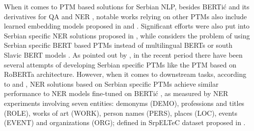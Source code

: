 When it comes to PTM based solutions for Serbian NLP, besides BERTić \cite{ljubevsic2021bertic} and its derivatives for QA \cite{cvetanovic2023} and NER \cite{ljubesic2023}, notable works relying on other PTMs also include learned embedding models proposed in \cite{milutin2024} and \cite{zivanic2024}. Significant efforts were also put into Serbian specific NER solutions proposed in \cite{perisic2023sr ,todorovic2021serbian}, while \cite{ikonic2024bert} considers the problem of using Serbian specific BERT based PTMs instead of multilingual BERTs \cite{conneau2020unsupervised, kenton2019bert} or south Slavic BERT models \cite{ljubevsic2021bertic}. As pointed out by \cite{skoric24modeli}, in the recent period there have been several attempts of developing Serbian specific PTMs like the \cite{Jerteh355} PTM based on RoBERTa architecture\cite{liu2019roberta}. However, when it comes to downstream tasks, according to \cite{skoric24modeli} and \cite{ikonic2024bert}, NER solutions based on Serbian specific PTMs achieve similar performance to NER models fine-tuned on BERTić \cite{ljubevsic2021bertic}, as measured by NER experiments involving seven entities: demonyms (DEMO), professions and titles (ROLE), works of art (WORK), person names (PERS), places (LOC), events (EVENT) and organizations (ORG); defined in SrpELTeC dataset proposed in \cite{todorovic2021serbian}.
